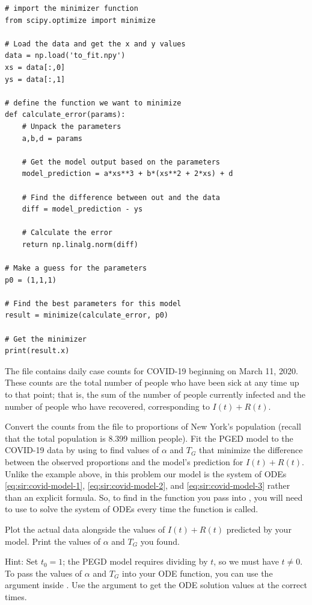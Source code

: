 \begin{lstlisting}
# import the minimizer function
from scipy.optimize import minimize

# Load the data and get the x and y values
data = np.load('to_fit.npy')
xs = data[:,0]
ys = data[:,1]

# define the function we want to minimize
def calculate_error(params):
    # Unpack the parameters
    a,b,d = params

    # Get the model output based on the parameters
    model_prediction = a*xs**3 + b*(xs**2 + 2*xs) + d

    # Find the difference between out and the data
    diff = model_prediction - ys

    # Calculate the error
    return np.linalg.norm(diff)

# Make a guess for the parameters
p0 = (1,1,1)

# Find the best parameters for this model
result = minimize(calculate_error, p0)

# Get the minimizer
print(result.x)
\end{lstlisting}


\begin{problem}\label{sir_nyc-model}
    The file  contains daily case counts for COVID-19 beginning on March 11, 2020.
    These counts are the total number of people who have been sick at any time up to that point; that is, the sum of the number of people currently infected and the number of people who have recovered, corresponding to $I(t)+R(t)$.
    
    Convert the counts from the file to proportions of New York's population (recall that the total population is 8.399 million people).
    Fit the PGED model to the COVID-19 data by using  to find values of $\alpha$ and $T_G$ that minimize the difference between the observed proportions and the model's prediction for $I(t)+R(t)$.
    Unlike the example above, in this problem our model is the system of ODEs \eqref{eq:sir:covid-model-1}, \eqref{eq:sir:covid-model-2}, and \eqref{eq:sir:covid-model-3} rather than an explicit formula.
    So, to find  in the function you pass into , you will need to use  to solve the system of ODEs every time the function is called.
    
    Plot the actual data alongside the values of $I(t)+R(t)$ predicted by your model.
    Print the values of $\alpha$ and $T_G$ you found.

    Hint: Set $t_0=1$; the PEGD model requires dividing by $t$, so we must have $t\ne0$.
    To pass the values of $\alpha$ and $T_G$ into your ODE function, you can use the argument  inside .
    Use the  argument to get the ODE solution values at the correct times.
\end{problem}

